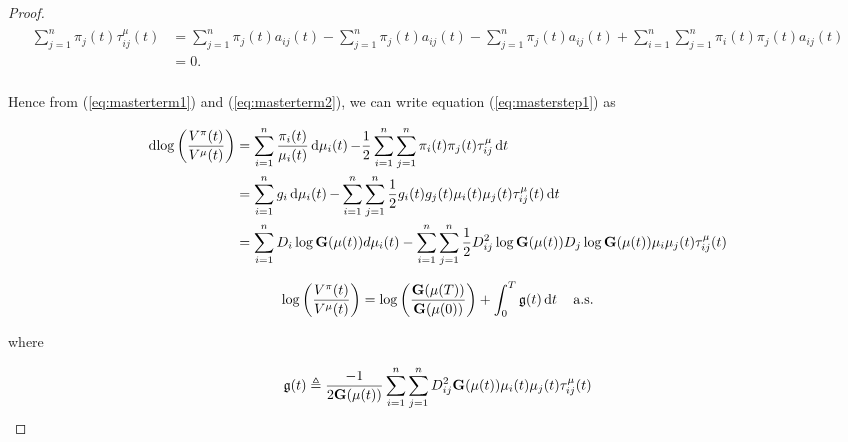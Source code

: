 \documentclass[british]{amsart} \usepackage{lmodern}
\numberwithin{equation}{section} \numberwithin{figure}{section}
\theoremstyle{plain} \newtheorem{thm}{\protect\theoremname}[section]
\theoremstyle{definition} \newtheorem{defn}[thm]{\protect\definitionname}
\theoremstyle{plain} \newtheorem{assumption}[thm]{\protect\assumptionname}
\theoremstyle{plain} \newtheorem{lem}[thm]{\protect\lemmaname}
\theoremstyle{plain} \newtheorem{prop}[thm]{\protect\propositionname}
\theoremstyle{remark} \newtheorem{rem}[thm]{\protect\remarkname}
\theoremstyle{plain} \newtheorem{cor}[thm]{\protect\corollaryname}
\renewcommand{\d}[1]{\mathop{\mathrm{d}{#1}}}
\begin{document}
\begin{proof}
\newcommand{\apii}{\sum_{j=1}^{n}\pi_{j}(t)a_{ij}(t)}
\newcommand{\apipi}{\sum_{i=1}^{n}\sum_{j=1}^{n}\pi_{i}(t)\pi_{j}(t)a_{ij}(t)}

  \begin{gather} 
    \begin{split} 
    \sum_{j=1}^{n} \pi_{j}(t) \tau_{ij}^{\mu} (t)
    &= 
    \sum_{j=1}^{n} \pi_{j}(t) a_{ij}(t) - \apii -
    \sum_{j=1}^{n} \pi_{j}(t) a_{ij}(t) + \apipi \\
    &= 0. \\
   \end{split} 
  \end{gather}

Hence from (\ref{eq:masterterm1}) and (\ref{eq:masterterm2}), we can write
equation (\ref{eq:masterstep1}) as

  \begin{gather} 
    \begin{split} 
      \d{ \log{ \left( \frac{V^{\pi}(t) }{ V^{\mu}(t) } \right) } } 
        &= 
            \sum_{i=1}^{n} \frac{\pi_{i}(t)}{\mu_{i}(t)} \d{\mu_{i}(t)} -
            \frac{1}{2}  \sum_{i=1}^{n} \sum_{j=1}^{n} 
            \pi_{i}(t)\pi_{j}(t)\tau_{ij}^{\mu}\d{t} \\
        &= \sum_{i=1}^{n} g_{i}\d{\mu_{i}(t)} -
            \sum_{i=1}^{n} \sum_{j=1}^{n} 
            \frac{1}{2} g_{i}(t)g_{j}(t)\mu_{i}(t)\mu_{j}(t)\tau_{ij}^{\mu}(t) \d{t} \\
        &= \sum_{i=1}^{n}  D_{i}\log{\Gmu} d{\mu_{i}(t)} -
            \sum_{i=1}^{n} \sum_{j=1}^{n} 
            \frac{1}{2} D_{ij}^2 \log{\Gmu} D_{j}\log{\Gmu} 
            \mu_{i}\mu_{j}(t)\tau_{ij}^{\mu}(t)
    \end{split} 
  \end{gather}

  \begin{equation}
    \label{eq:masterequation}
    \log \left( \frac{V^{\pi}(t)}{V^{\mu}(t)} \right) = 
    \log \left( \frac{\G{\mu(T)}}{\G{\mu(0)}} \right) + 
      \int_{0}^{T} \g \d{t}
    \quad \almostsurely
  \end{equation}

  where 

  \begin{equation}
    \mathfrak{g}(t) \triangleq \frac{-1}{2 \mathbf{G}(\mu(t))}
        \sum_{i=1}^{n} \sum_{j=1}^{n} D_{ij}^{2} \mathbf{G}(\mu(t)) 
        \mu_{i}(t) \mu_{j}(t)
        \tau_{ij}^{\mu}(t)
  \end{equation}

\end{proof}
\end{document}
